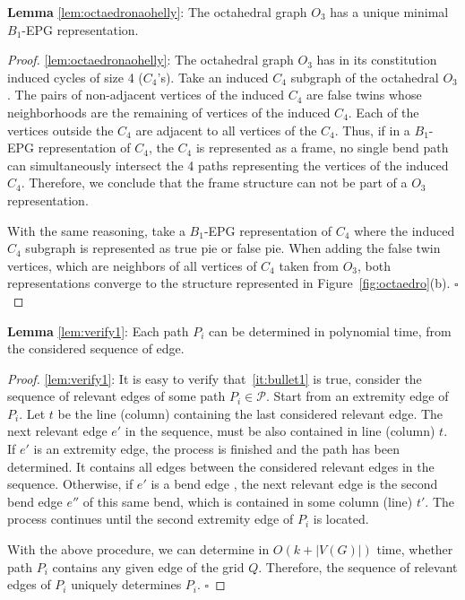 \documentclass[runningheads]{llncs}
\begin{document}
  
 

\begin{lemma*}\textbf{Lemma} \ref{lem:octaedronaohelly}:
The octahedral graph $O_3$ has a unique minimal  $ B_1$-EPG representation.%
\end{lemma*}

\begin{proof}
\ref{lem:octaedronaohelly}:
The octahedral graph $ O_3 $ has in its constitution induced cycles of size 4 ($ C_4$'s). 
Take an induced $ C_4 $ subgraph  of the octahedral $ O_3 $. The pairs of non-adjacent vertices of the induced $C_4$ are false twins whose neighborhoods are the remaining of vertices of the induced $C_4$. Each of the vertices outside the $C_4$ are adjacent to all vertices of the $C_4$. Thus, if in a $ B_1$-EPG representation of $C_4$, the $ C_4 $ is represented as a frame, no single bend path can simultaneously intersect the 4 paths representing the vertices of the induced $ C_4 $. Therefore, we conclude that the frame structure can not be part of a $ O_3 $ representation.

With the same reasoning, take a $ B_1$-EPG representation of $C_4$ where the induced $ C_4 $ subgraph is represented as true pie or false pie. When adding the false twin vertices, which are neighbors of all vertices of $ C_4 $ taken from $ O_3 $, both representations converge to the structure represented in Figure~\ref{fig:octaedro}(b). 
$\square$ \end{proof}

%

\begin{lemma*}\textbf{Lemma} \ref{lem:verify1}:
Each path $P_i$ can be determined in polynomial time, from the considered sequence of edge.
\end{lemma*}

\begin{proof}%
\ref{lem:verify1}: 
It is easy to verify that~\ref{it:bullet1} is true, consider the sequence of relevant edges of some path $P_i\in \mathcal{P}$. Start from an extremity edge of $P_i$. Let $t$ be the line (column) containing the last considered relevant edge. The next relevant edge $e'$ in the sequence, must be also contained in line (column) $t$. If $e'$ is an extremity edge, the process is finished and the path has been determined. It contains all edges between the considered relevant edges in the sequence. Otherwise, if $e'$ is a bend edge , the next relevant edge is the second bend edge $e''$ of this same bend, which is contained in some column (line) $t'$. The process continues until the second extremity edge of $P_i$ is located.   

With the above procedure, we can determine in $O(k+|V(G)|)$ time, whether path $P_i$ contains any given edge of the grid $Q$. Therefore, the sequence of relevant edges of $P_i$ uniquely determines $P_i$.
$\square$ \end{proof}
\end{document}
